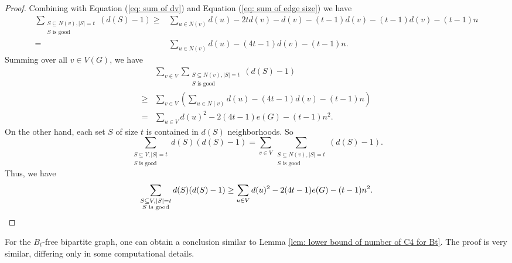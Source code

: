 \documentclass[11pt,a4paper]{article}
\theoremstyle{definition}
\begin{document}
\begin{proof}
            Combining with Equation (\ref{eq: sum of dv}) and Equation (\ref{eq: sum of edge size}) we have
            \begin{equation*}
                \begin{aligned}
                    \sum_{\substack{S \subseteq N(v), |S| = t \\ S \text{ is good}}} (d(S) - 1)
                    \geq& \sum_{u \in N(v)} d(u) - 2t d(v) - d(v) - (t-1) d(v) - (t-1) d(v) - (t-1) n \\
                    =& \sum_{u \in N(v)} d(u) - (4t-1) d(v) - (t-1)n.
                \end{aligned}
            \end{equation*}
            Summing over all $v \in V(G)$, we have
            \begin{equation*}
                \begin{aligned}
                    & \sum_{v \in V} \sum_{\substack{S \subseteq N(v), |S| = t \\ S \text{ is good}}} (d(S) - 1) \\
                    \geq& \sum_{v \in V} \left(\sum_{u \in N(v)} d(u) - (4t-1) d(v) - (t-1)n \right) \\
                    =& \sum_{u \in V} d(u)^2 - 2(4t-1) e(G) - (t-1) n^2.
                \end{aligned}
            \end{equation*}
            On the other hand, each set $S$ of size $t$ is contained in $d(S)$ neighborhoods. So
            \begin{equation*}
                \sum_{\substack{S \subseteq V, |S| = t \\ S \text{ is good}}} d(S)(d(S) - 1) = \sum_{v \in V} \sum_{\substack{S \subseteq N(v), |S| = t \\ S \text{ is good}}} (d(S) - 1).
            \end{equation*}
            Thus, we have
            \begin{equation*}
                \sum_{\substack{S \subseteq V, |S| = t \\ S \text{ is good}}} d(S)(d(S) - 1) \geq \sum_{u \in V} d(u)^2 - 2(4t-1) e(G) - (t-1) n^2.\qedhere
            \end{equation*} 
        \end{proof}

        For the $B_t$-free bipartite graph, one can obtain a conclusion similar to Lemma \ref{lem: lower bound of number of C4 for Bt}. 
        The proof is very similar, differing only in some computational details.
\end{document}
